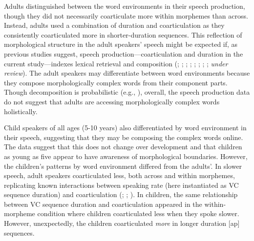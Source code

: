 \documentclass[a4paper,man,floatsintext,natbib,donotrepeattitle, apacite]{apa6}
\begin{document}
Adults distinguished between the word environments in their speech production, though they did not necessarily coarticulate more within morphemes than across. Instead, adults used a combination of duration and coarticulation as they consistently coarticulated more in shorter-duration sequences. This reflection of morphological structure in the adult speakers' speech might be expected if, as previous studies suggest, speech production---coarticulation and duration in the current study---indexes lexical retrieval and composition (\citealt{choEffectsMorphemeBoundaries2001}; \citealt{kempsProsodicCuesMorphological2005}; \citealt{lee-kimMorphologicalEffectsDarkness2013}; \citealt{plagHomophonyMorphologyAcoustics2017}; \citealt{pluymaekersMorphologicalEffectsFine2010}; \citealt{songEffectsCoarticulationMorphological2013}; \citeyear{songDurationalCuesFricative2013}; \citealt{sugaharaDurationalCorrelatesEnglish2009}; \citeauthor{tomaschekHowAnticipatoryCoarticulation2019} \textit{under review}). The adult speakers may differentiate between word environments because they compose morphologically complex words from their component parts. Though decomposition is probabilistic (e.g., \citealt{hayCausesConsequencesWord2003}), overall, the speech production data do not suggest that adults are accessing morphologically complex words holistically. 

Child speakers of all ages (5-10 years) also differentiated by word environment in their speech, suggesting that they may be composing the complex words online. The data suggest that this does not change over development and that children as young as five appear to have awareness of morphological boundaries. However, the children's patterns by word environment differed from the adults'. In slower speech, adult speakers coarticulated less, both across and within morphemes, replicating known interactions between speaking rate (here instantiated as VC sequence duration) and coarticulation (\citealt{agwueleEffectSpeakingRate2008}; \citealt{gayMechanismsControlSpeech1981}; \citealt{matthiesVariationAnticipatoryCoarticulation2001}). In children, the same relationship between VC sequence duration and coarticulation appeared in the within-morpheme condition where children coarticulated less when they spoke slower. However, unexpectedly, the children coarticulated \textit{more} in longer duration [ap] sequences.
\end{document}
